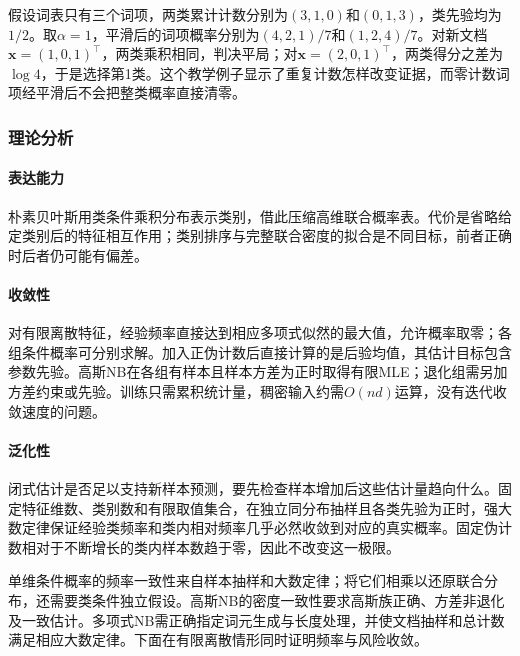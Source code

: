 假设词表只有三个词项，两类累计计数分别为$(3,1,0)$和$(0,1,3)$，类先验均为$1/2$。取$\alpha=1$，平滑后的词项概率分别为$(4,2,1)/7$和$(1,2,4)/7$。对新文档$\bm{x}=(1,0,1)^{\top}$，两类乘积相同，判决平局；对$\bm{x}=(2,0,1)^{\top}$，两类得分之差为$\log4$，于是选择第1类。这个教学例子显示了重复计数怎样改变证据，而零计数词项经平滑后不会把整类概率直接清零。

\subsubsection{理论分析}
\label{sec:classification-naive-bayes-theory}

\paragraph{表达能力}
朴素贝叶斯用类条件乘积分布表示类别，借此压缩高维联合概率表。代价是省略给定类别后的特征相互作用；类别排序与完整联合密度的拟合是不同目标，前者正确时后者仍可能有偏差。

\paragraph{收敛性}
对有限离散特征，经验频率直接达到相应多项式似然的最大值，允许概率取零；各组条件概率可分别求解。加入正伪计数后直接计算的是后验均值，其估计目标包含参数先验。高斯NB在各组有样本且样本方差为正时取得有限MLE；退化组需另加方差约束或先验。训练只需累积统计量，稠密输入约需$O(nd)$运算，没有迭代收敛速度的问题。

\paragraph{泛化性}
闭式估计是否足以支持新样本预测，要先检查样本增加后这些估计量趋向什么。固定特征维数、类别数和有限取值集合，在独立同分布抽样且各类先验为正时，强大数定律保证经验类频率和类内相对频率几乎必然收敛到对应的真实概率。固定伪计数相对于不断增长的类内样本数趋于零，因此不改变这一极限。

单维条件概率的频率一致性来自样本抽样和大数定律；将它们相乘以还原联合分布，还需要类条件独立假设。高斯NB的密度一致性要求高斯族正确、方差非退化及一致估计。多项式NB需正确指定词元生成与长度处理，并使文档抽样和总计数满足相应大数定律。下面在有限离散情形同时证明频率与风险收敛。

